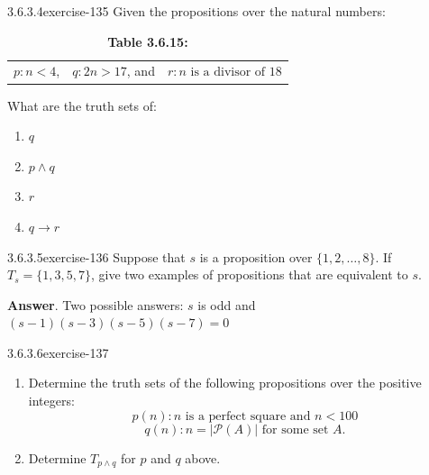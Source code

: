 \documentclass[twoside,10pt,]{book}
\numberwithin{equation}{section}
\begin{document}
\begin{divisionsolution}{3.6.3.4}{}{exercise-135}%
\hypertarget{p-1288}{}%
Given the propositions over the natural numbers:%
\begin{table}
\centering
\begin{tabular}{lll}
\(p : n < 4\),&\(q : 2n > 17\), and&\(r : n \textrm{ is  a  divisor of } 18\)
\end{tabular}
\caption*{\textbf{Table 3.6.15:} }
\end{table}
\hypertarget{p-1289}{}%
What are the truth sets of:\leavevmode%
\begin{multicols}{2}
\begin{enumerate}[label=(\alph*)]
\item\hypertarget{li-733}{}\hypertarget{p-1290}{}%
\(q\)%
\item\hypertarget{li-734}{}\hypertarget{p-1291}{}%
\(p\land q\)%
\item\hypertarget{li-735}{}\hypertarget{p-1292}{}%
\(r\)%
\item\hypertarget{li-736}{}\hypertarget{p-1293}{}%
\(q\to r\)%
\end{enumerate}
\end{multicols}
%
\end{divisionsolution}%
\begin{divisionsolution}{3.6.3.5}{}{exercise-136}%
\hypertarget{p-1294}{}%
Suppose that \(s\) is a proposition over \(\{1, 2,\dots, 8\}\). If \(T_s = \{1, 3, 5, 7\}\), give two examples of propositions that are equivalent to \(s\).%
\par\smallskip%
\noindent\textbf{Answer}.\quad%
\hypertarget{p-1295}{}%
Two possible answers: \(s\) is odd and \((s-1)(s-3)(s-5)(s-7)=0\)%
\end{divisionsolution}%
\begin{divisionsolution}{3.6.3.6}{}{exercise-137}%
\hypertarget{p-1296}{}%
\leavevmode%
\begin{enumerate}[label=(\alph*)]
\item\hypertarget{li-737}{}\hypertarget{p-1297}{}%
Determine the truth sets of the following propositions over the positive integers:%
\begin{equation*}
p(n) : n \textrm{ is a perfect square and }  n < 100
\end{equation*}
%
\begin{equation*}
q(n) : n = \lvert \mathcal{P}(A) \rvert \textrm{ for some set } A\text{.}
\end{equation*}
%
\item\hypertarget{li-738}{}\hypertarget{p-1298}{}%
Determine \(T_{p\land q}\) for \(p\) and \(q\) above.%
\end{enumerate}
%
\end{divisionsolution}%
\end{document}
